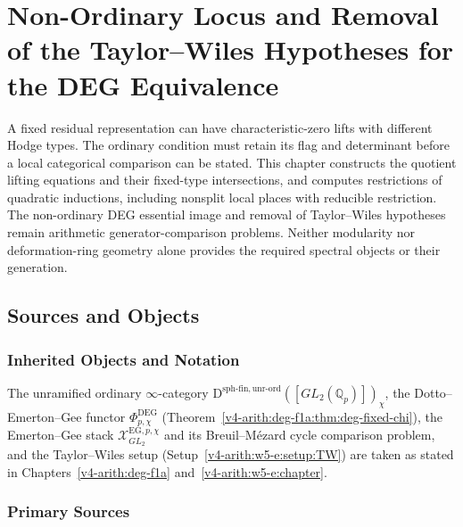 \chapter{Non-Ordinary Locus and Removal of the Taylor--Wiles Hypotheses for the DEG Equivalence}
\label{v4-arith:w6-e:chapter}

A fixed residual representation can have characteristic-zero lifts
with different Hodge types. The ordinary condition must retain its flag
and determinant before a local categorical comparison can be stated.
This chapter constructs the quotient lifting equations and their
fixed-type intersections, and computes restrictions of quadratic
inductions, including nonsplit local places with reducible restriction.
The non-ordinary DEG essential image and removal of Taylor--Wiles
hypotheses remain arithmetic generator-comparison problems. Neither
modularity nor deformation-ring geometry alone provides the required
spectral objects or their generation.

\section{Sources and Objects}
\label{v4-arith:w6-e:domain}

\subsection{Inherited Objects and Notation}

The unramified ordinary \(\infty\)-category
\(\mathrm{D}^{\mathrm{sph\text{-}fin,unr\text{-}ord}}([GL_{2}(\mathbb{Q}_{p})])_{\chi}\),
the Dotto--Emerton--Gee functor \(\Phi^{\mathrm{DEG}}_{p,\chi}\)
(Theorem~\ref{v4-arith:deg-f1a:thm:deg-fixed-chi}), the Emerton--Gee stack
\(\mathcal{X}^{\mathrm{EG},p,\chi}_{GL_{2}}\) and its Breuil--M{\'e}zard
cycle comparison problem, and the Taylor--Wiles setup
(Setup~\ref{v4-arith:w5-e:setup:TW}) are taken as stated in
Chapters~\ref{v4-arith:deg-f1a} and~\ref{v4-arith:w5-e:chapter}.

\subsection{Primary Sources}
\label{v4-arith:w6-e:sources}

